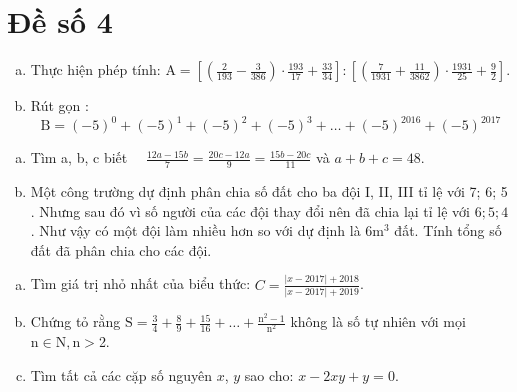 \section{Đề số 4}

\begin{bt} 
   \hfill
   \begin{enumerate}[a.]
    \item Thực hiện phép tính: $\mathrm{A}=\left[\left(\frac{2}{193}-\frac{3}{386}\right) \cdot \frac{193}{17}+\frac{33}{34}\right]:\left[\left(\frac{7}{1931}+\frac{11}{3862}\right) \cdot \frac{1931}{25}+\frac{9}{2}\right]$.
    \item Rút gọn :    
    $$
    \mathrm{B}=(-5)^0+(-5)^1+(-5)^2+(-5)^3+\ldots+(-5)^{2016}+(-5)^{2017}
    $$
   \end{enumerate}
\loigiai{} 
\end{bt}

\begin{bt}
    \hfill
    \begin{enumerate}[a.]
        \item Tìm a, b, c biết $\quad \frac{12 a-15 b}{7}=\frac{20 c-12 a}{9}=\frac{15 b-20 c}{11}$ và $a+b+c=48$.
        \item Một công trường dự định phân chia số đất cho ba đội I, II, III tỉ lệ với 7; 6; 5 . Nhưng sau đó vì số người của các đội thay đổi nên đã chia lại tỉ lệ với $6 ; 5 ; 4$. Như vậy có một đội làm nhiều hơn so với dự định là $6 \mathrm{m}^3$ đất. Tính tổng số đất đã phân chia cho các đội.
    \end{enumerate}
\loigiai{} 
\end{bt}

\begin{bt}
   \hfill
   \begin{enumerate}[a.]
    \item Tìm giá trị nhỏ nhất của biểu thức: $C=\frac{|x-2017|+2018}{|x-2017|+2019}$.
    \item Chứng tỏ rằng $\mathrm{S}=\frac{3}{4}+\frac{8}{9}+\frac{15}{16}+\ldots+\frac{\mathrm{n}^2-1}{\mathrm{n}^2}$ không là số tự nhiên với mọi $\mathrm{n} \in \mathrm{N}, \mathrm{n}>$2.
    \item Tìm tất cả các cặp số nguyên $x$, $y$ sao cho: $x-2 x y+y=0$.
   \end{enumerate}
\loigiai{} 
\end{bt}

